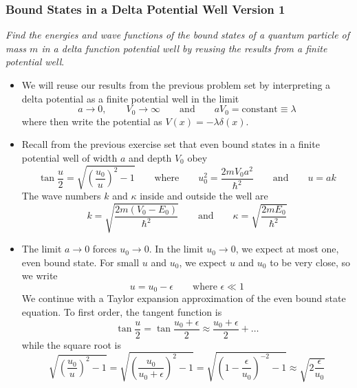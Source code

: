 \documentclass[11pt, a4paper]{article}
\newcommand{\eqtext}[1]{\qquad \text{#1} \qquad}
\begin{document}
\subsubsection{Bound States in a Delta Potential Well Version 1}
\textit{Find the energies and wave functions of the bound states of a quantum particle of mass $ m $ in a delta function potential well by reusing the results from a finite potential well}. 
\begin{itemize}
	\item We will reuse our results from the previous problem set by interpreting a delta potential as a finite potential well in the limit 
	\begin{equation*}
		a \to 0, \qquad V_{0} \to \infty \eqtext{and} aV_{0} = \text{constant} \equiv \lambda 
	\end{equation*}
	where then write the potential as $ V(x) = - \lambda \delta(x) $. 
	
	\item Recall from the previous exercise set that even bound states in a finite potential well of width $ a $ and depth $ V_{0} $ obey
	\begin{equation*}
		\tan \frac{u}{2} = \sqrt{\left(\frac{u_{0}}{u}\right)^{2} -1} \eqtext{where} u_{0}^{2} = \frac{2mV_{0}a^{2}}{\hbar^{2}} \eqtext{and} u = ak
	\end{equation*}
	The wave numbers $ k $ and $ \kappa $ inside and outside the well are
	\begin{equation*}
		k = \sqrt{\frac{2m(V_{0}- E_{0})}{\hbar^{2}}} \eqtext{and} \kappa = \sqrt{\frac{2mE_{0}}{\hbar^{2}}}
	\end{equation*}
	
	\item The limit $ a \to 0 $ forces $ u_{0} \to 0 $. In the limit $ u_{0} \to 0 $, we expect at most one, even bound state.	For small $ u $ and $ u_{0} $, we expect $ u $ and $ u_{0} $ to be very close, so we write
	\begin{equation*}
		u = u_{0} - \epsilon \qquad \text{where } \epsilon \ll 1
	\end{equation*}
	We continue with a Taylor expansion approximation of the even bound state equation. To first order, the tangent function is
	\begin{equation*}
		\tan \frac{u}{2} = \tan \frac{u_{0} + \epsilon}{2} \approx \frac{u_{0} + \epsilon}{2} + \dots 
	\end{equation*}
	while the square root is
	\begin{equation*}
		\sqrt{\left(\frac{u_{0}}{u}\right)^{2} -1} = \sqrt{\left(\frac{u_{0}}{u_{0} + \epsilon}\right)^{2} -1} = \sqrt{\left(1 - \frac{\epsilon}{u_{0}}\right)^{-2} -1} \approx \sqrt{2\frac{\epsilon}{u_{0}}}
	\end{equation*}
	

\end{itemize}
\end{document}
